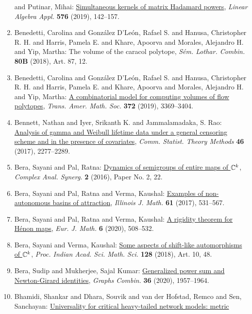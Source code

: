 \begin{enumerate}
and Putinar, Mihai: \href{https://doi.org/10.1016/j.laa.2018.03.035}{Simultaneous kernels of matrix {H}adamard powers}, \emph{Linear Algebra Appl.} {\bf 576} (2019), 142--157.
\item Benedetti, Carolina and Gonz\'{a}lez D'Le\'{o}n, Rafael S. and Hanusa,
Christopher R. H. and Harris, Pamela E. and Khare, Apoorva and
Morales, Alejandro H. and Yip, Martha: The volume of the caracol polytope, \emph{S\'{e}m. Lothar. Combin.} {\bf 80B} (2018), Art. 87, 12.
\item Benedetti, Carolina and Gonz\'{a}lez D'Le\'{o}n, Rafael S. and Hanusa,
Christopher R. H. and Harris, Pamela E. and Khare, Apoorva and
Morales, Alejandro H. and Yip, Martha: \href{https://doi.org/10.1090/tran/7743}{A combinatorial model for computing volumes of flow polytopes}, \emph{Trans. Amer. Math. Soc.} {\bf 372} (2019), 3369--3404.
\item Bennett, Nathan and Iyer, Srikanth K. and Jammalamadaka, S.
Rao: \href{https://doi.org/10.1080/03610926.2015.1041981}{Analysis of gamma and {W}eibull lifetime data under a general
censoring scheme and in the presence of covariates}, \emph{Comm. Statist. Theory Methods} {\bf 46} (2017), 2277--2289.
\item Bera, Sayani and Pal, Ratna: \href{https://doi.org/10.1186/s40627-016-0006-x}{Dynamics of semigroups of entire maps of {$\Bbb{C}^k$}}, \emph{Complex Anal. Synerg.} {\bf 2} (2016), Paper No. 2, 22.
\item Bera, Sayani and Pal, Ratna and Verma, Kaushal: \href{https://projecteuclid.org/euclid.ijm/1534924839}{Examples of non-autonomous basins of attraction}, \emph{Illinois J. Math.} {\bf 61} (2017), 531--567.
\item Bera, Sayani and Pal, Ratna and Verma, Kaushal: \href{https://doi.org/10.1007/s40879-019-00326-7}{A rigidity theorem for {H}\'{e}non maps}, \emph{Eur. J. Math.} {\bf 6} (2020), 508--532.
\item Bera, Sayani and Verma, Kaushal: \href{https://doi.org/10.1007/s12044-018-0388-1}{Some aspects of shift-like automorphisms of {$\Bbb C^k$}}, \emph{Proc. Indian Acad. Sci. Math. Sci.} {\bf 128} (2018), Art. 10, 48.
\item Bera, Sudip and Mukherjee, Sajal Kumar: \href{https://doi.org/10.1007/s00373-020-02223-3}{Generalized power sum and {N}ewton-{G}irard identities}, \emph{Graphs Combin.} {\bf 36} (2020), 1957--1964.
\item Bhamidi, Shankar and Dhara, Souvik and van der Hofstad, Remco
and Sen, Sanchayan: \href{https://doi.org/10.1214/19-ejp408}{Universality for critical heavy-tailed network models: metric
}
\end{enumerate}

